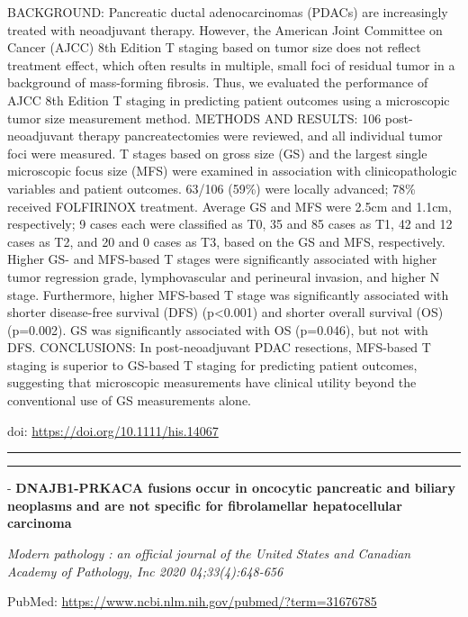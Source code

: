 \documentclass[
]{article}
\begin{document}
BACKGROUND: Pancreatic ductal adenocarcinomas (PDACs) are increasingly
treated with neoadjuvant therapy. However, the American Joint Committee
on Cancer (AJCC) 8th Edition T staging based on tumor size does not
reflect treatment effect, which often results in multiple, small foci of
residual tumor in a background of mass-forming fibrosis. Thus, we
evaluated the performance of AJCC 8th Edition T staging in predicting
patient outcomes using a microscopic tumor size measurement method.
METHODS AND RESULTS: 106 post-neoadjuvant therapy pancreatectomies were
reviewed, and all individual tumor foci were measured. T stages based on
gross size (GS) and the largest single microscopic focus size (MFS) were
examined in association with clinicopathologic variables and patient
outcomes. 63/106 (59\%) were locally advanced; 78\% received FOLFIRINOX
treatment. Average GS and MFS were 2.5cm and 1.1cm, respectively; 9
cases each were classified as T0, 35 and 85 cases as T1, 42 and 12 cases
as T2, and 20 and 0 cases as T3, based on the GS and MFS, respectively.
Higher GS- and MFS-based T stages were significantly associated with
higher tumor regression grade, lymphovascular and perineural invasion,
and higher N stage. Furthermore, higher MFS-based T stage was
significantly associated with shorter disease-free survival (DFS)
(p\textless0.001) and shorter overall survival (OS) (p=0.002). GS was
significantly associated with OS (p=0.046), but not with DFS.
CONCLUSIONS: In post-neoadjuvant PDAC resections, MFS-based T staging is
superior to GS-based T staging for predicting patient outcomes,
suggesting that microscopic measurements have clinical utility beyond
the conventional use of GS measurements alone.

doi: \url{https://doi.org/10.1111/his.14067}

\begin{center}\rule{0.5\linewidth}{0.5pt}\end{center}

\begin{center}\rule{0.5\linewidth}{0.5pt}\end{center}

- \textbf{DNAJB1-PRKACA fusions occur in oncocytic pancreatic and
biliary neoplasms and are not specific for fibrolamellar hepatocellular
carcinoma}

\emph{Modern pathology : an official journal of the United States and
Canadian Academy of Pathology, Inc 2020 04;33(4):648-656}

PubMed: \url{https://www.ncbi.nlm.nih.gov/pubmed/?term=31676785}
\end{document}
